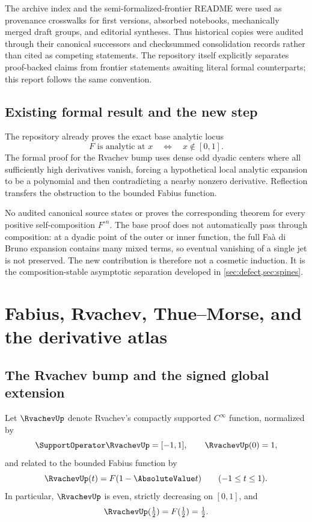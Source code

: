 \documentclass[11pt,oneside]{article}
\theoremstyle{definition}
\theoremstyle{remark}
\newcommand{\comp}{\mathbin{\circ}}
\newcommand{\half}{\tfrac12}
\begin{document}
The archive index and the semi-formalized-frontier README were used as provenance
crosswalks for first versions, absorbed notebooks, mechanically merged draft groups,
and editorial syntheses.  Thus historical copies were audited through their canonical
successors and checksummed consolidation records rather than cited as competing
statements.  The repository itself explicitly separates proof-backed claims from
frontier statements awaiting literal formal counterparts; this report follows the
same convention.

\subsection{Existing formal result and the new step}

The repository already proves the exact base analytic locus
\begin{equation}
  F\text{ is analytic at }x\quad\Longleftrightarrow\quad x\notin[0,1].
  \label{eq:base-locus}
\end{equation}
The formal proof for the Rvachev bump uses dense odd dyadic centers where all
sufficiently high derivatives vanish, forcing a hypothetical local analytic expansion
to be a polynomial and then contradicting a nearby nonzero derivative.  Reflection
transfers the obstruction to the bounded Fabius function.

No audited canonical source states or proves the corresponding theorem for every
positive self-composition $F^{\comp n}$.  The base proof does not automatically pass
through composition: at a dyadic point of the outer or inner function, the full
Fa\`a di Bruno expansion contains many mixed terms, so eventual vanishing of a single
jet is not preserved.  The new contribution is therefore not a cosmetic induction.
It is the composition-stable asymptotic separation developed in
\cref{sec:defect,sec:spines}.

\section{Fabius, Rvachev, Thue--Morse, and the derivative atlas}
\label{sec:background}

\subsection{The Rvachev bump and the signed global extension}

Let $\RvachevUp$ denote Rvachev's compactly supported $C^\infty$ function, normalized by
\[
 \SupportOperator\RvachevUp=[-1,1],\qquad \RvachevUp(0)=1,
\]
and related to the bounded Fabius function by
\begin{equation}
 \RvachevUp(t)=F(1-\AbsoluteValue t)\qquad(-1\leq t\leq1).
 \label{eq:up-F}
\end{equation}
In particular, $\RvachevUp$ is even, strictly decreasing on $[0,1]$, and
\begin{equation}
 \RvachevUp(\half)=F(\half)=\half.
 \label{eq:up-half}
\end{equation}
\end{document}
